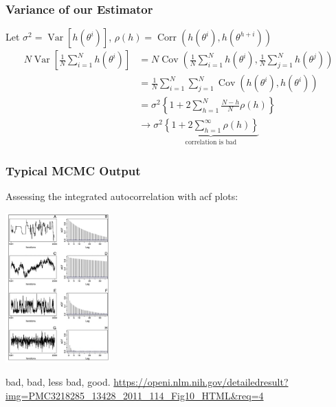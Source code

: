 \documentclass{beamer}
\begin{document}
\begin{frame}
\frametitle{Variance of our Estimator}

Let $\sigma^2 = \operatorname{Var}[h(\theta^i)]$, $\rho(h) = \operatorname{Corr}\left(  h(\theta^i), h(\theta^{h+i}) \right)$
\begin{align*}
N \operatorname{Var}\left[ \frac{1}{N}\sum_{i=1}^N h(\theta^i) \right] &= N\operatorname{Cov}\left( \frac{1}{N}\sum_{i=1}^N h(\theta^i),\frac{1}{N}\sum_{j=1}^N h(\theta^j) \right) \\
&= \frac{1}{N} \sum_{i=1}^N\sum_{j=1}^N\operatorname{Cov}\left(  h(\theta^i), h(\theta^i) \right) \tag{bilinearity} \\
&= \sigma^2 \left\{ 1 + 2\sum_{h=1}^N \frac{N - h}{N} \rho(h)\right\}  \tag{count diagonally} \\
&\to \sigma^2 \underbrace{\left\{ 1 + 2\sum_{h=1}^{\infty}  \rho(h)\right\}}_{\text{correlation is bad}} 
\end{align*}



\end{frame}


\begin{frame}
\frametitle{Typical MCMC Output}

Assessing the integrated autocorrelation with acf plots:
\begin{center}
\includegraphics[width=40mm]{autocorr.png}
\end{center}
bad, bad, less bad, good.
\url{https://openi.nlm.nih.gov/detailedresult?img=PMC3218285_13428_2011_114_Fig10_HTML&req=4}

\end{frame}
\end{document}
